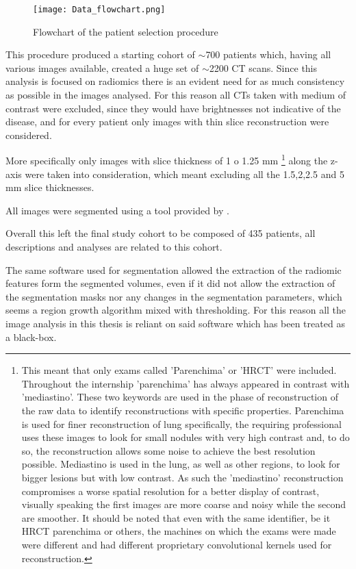 \begin{figure}
\texttt{[image: Data\_flowchart.png]}
\caption{Flowchart of the patient selection procedure \label{fig:dataSelFlowchart}}
\end{figure}

This procedure produced a starting cohort of $\sim$700 patients which, having all various images available, created a huge set of $\sim$2200 CT scans. Since this analysis is focused on radiomics there is an evident need for as much consistency as possible in the images analysed. For this reason all CTs taken with medium of contrast were excluded, since they would have brightnesses not indicative of the disease, and for every patient only images with thin slice reconstruction were considered. 

More specifically only images with slice thickness of 1 o 1.25 mm
\footnote{This meant that only exams called 'Parenchima' or  'HRCT' were included. Throughout the internship 'parenchima' has always appeared in contrast with 'mediastino'. These two keywords are used in the phase of reconstruction of the raw data to identify reconstructions with specific properties. Parenchima is used for finer reconstruction of lung specifically, the requiring professional uses these images to look for small nodules with very high contrast and, to do so, the reconstruction allows some noise to achieve the best resolution possible. Mediastino is used in the lung, as well as other regions, to look for bigger lesions but with low contrast. As such the 'mediastino' reconstruction compromises a worse spatial resolution for a better display of contrast, visually speaking the first images are more coarse and noisy while the second are smoother. It should be noted that even with the same identifier, be it HRCT parenchima or others, the machines on which the exams were made were different and had different proprietary convolutional kernels used for reconstruction.} 
along the z-axis were taken into consideration, which meant excluding all the 1.5,2,2.5 and 5 mm slice thicknesses.

All images were segmented using a tool provided by \orsola.

Overall this left the final study cohort to be composed of 435 patients, all descriptions and analyses are related to this cohort.

The same software used for segmentation allowed the extraction of the radiomic features form the segmented volumes, even if it did not allow the extraction of the segmentation masks nor any changes in the segmentation parameters, which seems a region growth algorithm mixed with thresholding. For this reason all the image analysis in this thesis is reliant on said software which has been treated as a black-box.

